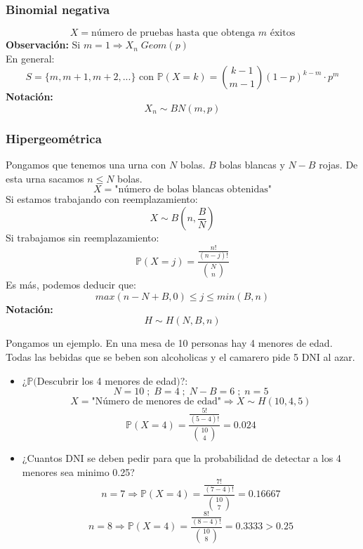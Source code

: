 \documentclass[11pt]{article}
\newcommand{\prob}{\mathbb{P}}
\theoremstyle{plain}
\begin{document}
            \subsubsection{Binomial negativa} %
            \label{subsub:binomial_negativa}
                \[X = \text{número de pruebas hasta que obtenga $m$ éxitos}\]
                \textbf{Observación:} Si $m=1 \Rightarrow X_n \; Geom(p)$\\
                En general:
                \[S =  \{m,m+1,m+2,...\} \text{ con } \prob(X=k) = \binom{k-1}{m-1}(1-p)^{k-m}\cdot p^m \]
                \textbf{Notación:}\[X_n \sim BN(m,p)\]
            \subsubsection{Hipergeométrica} %
            \label{subsub:hipergeometrica}
            Pongamos que tenemos una urna con $N$ bolas. $B$ bolas blancas y $N-B$ rojas. De esta urna sacamos $n\le N$ bolas. 
            \[X = \text{"número de bolas blancas obtenidas"}\]
            Si estamos trabajando con reemplazamiento:
            \[X \sim B(n, \frac{B}{N})\]
            Si trabajamos sin reemplazamiento:
            \[\prob(X=j) = \frac{\frac{n!}{(n-j)!}}{\binom{N}{n}}\]
            Es más, podemos deducir que:
            \[max(n-N+B,0) \le j \le min(B,n)\]
            \textbf{Notación:}\[H\sim H(N,B,n)\]

            Pongamos un ejemplo. En una mesa de 10 personas hay 4 menores de edad. Todas las bebidas que se beben son alcoholicas y el camarero pide 5 DNI al azar.
            \begin{itemize}
                \item ¿$\prob($Descubrir los 4 menores de edad$)$?:
                \[N = 10 \; ; \; B = 4 \; ; \; N-B=6 \; ; \; n = 5\]
                \[X = \text{"Número de menores de edad"} \Rightarrow X \sim H(10,4,5)\]
                \[\prob(X=4) = \frac{\frac{5!}{(5-4)!}}{\binom{10}{4}} = 0.024\]
                \item ¿Cuantos DNI se deben pedir para que la probabilidad de detectar a los 4 menores sea minimo 0.25?
                \[n=7 \Rightarrow \prob(X=4) = \frac{\frac{7!}{(7-4)!}}{\binom{10}{7}} = 0.16667\]
                \[n=8 \Rightarrow \prob(X=4) = \frac{\frac{8!}{(8-4)!}}{\binom{10}{8}} = 0.3333 > 0.25\]
            \end{itemize}
\end{document}
